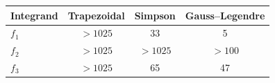 \begin{tabular}{lccc}
\toprule
Integrand & Trapezoidal & Simpson & Gauss--Legendre \\
\midrule
$f_1$ & $>\!1025$ & 33 & 5 \\
$f_2$ & $>\!1025$ & $>\!1025$ & $>\!100$ \\
$f_3$ & $>\!1025$ & 65 & 47 \\
\bottomrule
\end{tabular}
